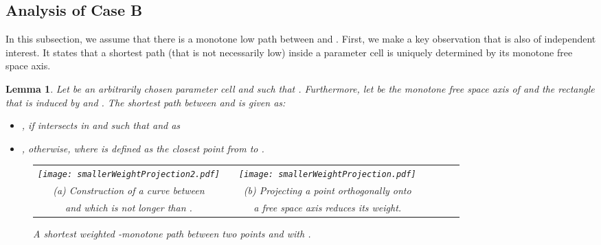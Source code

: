 \documentclass[a4paper,11pt]{article}
\newtheorem{lemma}{Lemma}
\begin{document}
\subsection{Analysis of Case B}\label{subsubsec:anaG2}
 In this subsection, we assume that there is a monotone low path  between  and . 
First, we make a key observation that is also of independent interest. It states that a shortest path (that is not necessarily low) inside a parameter cell is uniquely determined by its monotone free space axis.
\begin{lemma}\label{lem:key}
	Let  be an arbitrarily chosen parameter cell and  such that . Furthermore, let  be the monotone free space axis of  and  the rectangle that is induced by  and . The shortest path  between  and  is given as:
		\begin{itemize}
			 \item  , if  intersects  in  and  such that  and as
			\item , otherwise, where  is defined as the closest point from  to .
		\end{itemize}
		
\begin{figure}[ht]
  \begin{center}
    \begin{tabular}{ccccccc}
      \texttt{[image: smallerWeightProjection2.pdf]} & &
       \texttt{[image: smallerWeightProjection.pdf]}&&\\ 
{\small (a) Construction of a curve  between} & &
      {\small (b) Projecting a point orthogonally onto}&&\\
      {\small  and  which is not longer than .}&&
      {\small a free space axis reduces its weight.}&&
    \end{tabular}
  \end{center}
  \vspace*{-12pt}
  \caption{A shortest weighted -monotone path between two points  and  with .}
  \label{fig:smallerWeightProjection}
\end{figure}
		
\end{lemma}
\end{document}
